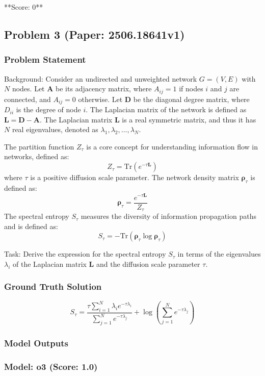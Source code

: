 \documentclass[10pt]{article}
\begin{document}
**Score: 0**

\newpage
\subsection*{Problem 3 (Paper: 2506.18641v1)}
\subsubsection*{Problem Statement}
Background:
Consider an undirected and unweighted network $G=(V,E)$ with $N$ nodes. Let $\mathbf{A}$ be its adjacency matrix, where $A_{ij}=1$ if nodes $i$ and $j$ are connected, and $A_{ij}=0$ otherwise. Let $\mathbf{D}$ be the diagonal degree matrix, where $D_{ii}$ is the degree of node $i$. The Laplacian matrix of the network is defined as $\mathbf{L = D - A}$. The Laplacian matrix $\mathbf{L}$ is a real symmetric matrix, and thus it has $N$ real eigenvalues, denoted as $\lambda_1, \lambda_2, \dots, \lambda_N$.

The partition function $Z_{\tau}$ is a core concept for understanding information flow in networks, defined as:
$$Z_{\tau} = \text{Tr}(e^{-\tau \mathbf{L}})$$
where $\tau$ is a positive diffusion scale parameter. The network density matrix $\pmb{\rho}_{\tau}$ is defined as:
$$\pmb{\rho}_{\tau} = \frac{e^{-\tau \mathbf{L}}}{Z_{\tau}}$$
The spectral entropy $S_{\tau}$ measures the diversity of information propagation paths and is defined as:
$$S_{\tau} = -\text{Tr}(\pmb{\rho}_{\tau} \log \pmb{\rho}_{\tau})$$

Task:
Derive the expression for the spectral entropy $S_{\tau}$ in terms of the eigenvalues $\lambda_i$ of the Laplacian matrix $\mathbf{L}$ and the diffusion scale parameter $\tau$.

\subsubsection*{Ground Truth Solution}
\[ \boxed{S_{\tau} = \frac{\tau \sum_{i=1}^N \lambda_i e^{-\tau \lambda_i}}{\sum_{j=1}^N e^{-\tau \lambda_j}} + \log \left( \sum_{j=1}^N e^{-\tau \lambda_j} \right)} \]

\subsubsection*{Model Outputs}
\subsubsection*{Model: o3 (Score: 1.0)}
\end{document}
